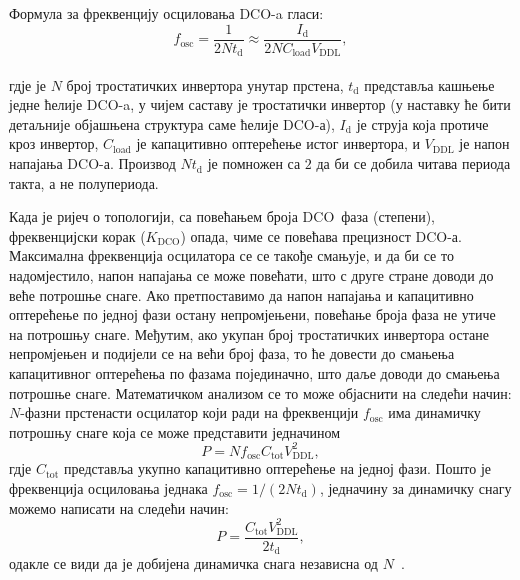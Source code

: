 \documentclass[master]{finthesis}
\def \DCO  {DCO} %
\begin{document}
Формула за фреквенцију осциловања \DCO-a гласи:
\begin{equation} \label{f_osc}
    f_\text{osc} = \dfrac{1}{2Nt_\text{d}} \approx \dfrac{I_\text{d}}{2NC_\text{load}V_\text{DDL}},
\end{equation} \\
гдје је $N$ број тростатичких инвертора унутар прстена, $t_\text{d}$ представља кашњење једне ћелије \DCO-a, у чијем саставу је тростатички инвертор (у наставку ће бити детаљније објашњена структура саме ћелије \DCO-а), $I_\text{d}$ је струја која протиче кроз инвертор, $C_\text{load}$ је капацитивно оптерећење истог инвертора, и $V_\text{DDL}$ је напон напајања \DCO-а. Производ $Nt_\text{d}$ је помножен са $2$ да би се добила читава периода такта, а не полупериода. \par
Када је ријеч о топологији, са повећањем броја \DCO\ фаза (степени), фреквенцијски корак ($K_\text{DCO}$) опада, чиме се повећава прецизност \DCO-а. Максимална фреквенција осцилатора се се такође смањује, и да би се то надомјестило, напон напајања се може повећати, што с друге стране доводи до веће потрошње снаге. Ако претпоставимо да напон напајања и капацитивно оптерећење по једној фази остану непромјењени, повећање броја фаза не утиче на потрошњу снаге. Међутим, ако укупан број тростатичких инвертора остане непромјењен и подијели се на већи број фаза, то ће довести до смањења капацитивног оптерећења по фазама појединачно, што даље доводи до смањења потрошње снаге. Математичком анализом се то може објаснити на следећи начин: $N$-фазни прстенасти осцилатор који ради на фреквенцији $f_\text{osc}$ има динамичку потрошњу снаге која се може представити једначином
\begin{equation} \label{dynamic power}
    	P = N f_\text{osc} C_\text{tot} V^{2}_\text{DDL}, 
\end{equation}
гдје $C_\text{tot}$ представља укупно капацитивно оптерећење на једној фази. Пошто је фреквенција осциловања једнака $f_\text{osc} = 1/(2Nt_\text{d})$, једначину за динамичку снагу можемо написати на следећи начин:
\begin{equation}
    	P = \frac{C_\text{tot}V^{2}_\text{DDL}}{2t_\text{d}},
\end{equation}
одакле се види да је добијена динамичка снага независна од $N$~\cite{Razavi:PLL_CMOS_2020}.
\end{document}
